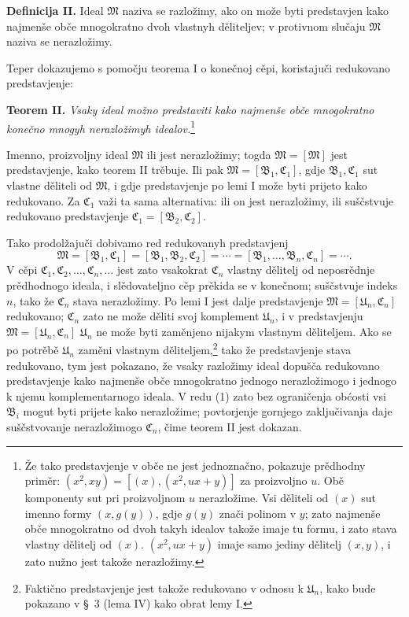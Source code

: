 \documentclass[11pt]{article}
\newcommand{\ideal}[1]{\mathfrak{#1}}
\begin{document}
\textbf{Definicija II.} Ideal \(\ideal M\) naziva se razložimy, ako on može byti predstavjen kako najmenše obče mnogokratno dvoh vlastnyh děliteljev; v protivnom slučaju \(\ideal M\) naziva se nerazložimy.

Teper dokazujemo s pomočju teorema I o konečnoj cěpi, koristajuči redukovano predstavjenje:

\textbf{Teorem II.} \emph{Vsaky ideal možno predstaviti kako najmenše obče mnogokratno konečno mnogyh nerazložimyh idealov.}\footnote{Že tako predstavjenje v obče ne jest jednoznačno, pokazuje prědhodny priměr: \((x^2,xy)=[(x),(x^2,ux+y)]\) za proizvoljno \(u\). Obě komponenty sut pri proizvoljnom \(u\) nerazložime. Vsi děliteli od \((x)\) sut imenno formy \((x,g(y))\), gdje \(g(y)\) znači polinom v \(y\); zato najmenše obče mnogokratno od dvoh takyh idealov takože imaje tu formu, i zato stava vlastny dělitelj od \((x)\). \((x^2,ux+y)\) imaje samo jediny dělitelj \((x,y)\), i zato nužno jest takože nerazložimy.}

Imenno, proizvoljny ideal \(\ideal M\) ili jest nerazložimy; togda \(\ideal M=[\ideal M]\) jest predstavjenje, kako teorem II trěbuje. Ili pak \(\ideal M=[\ideal B_1,\ideal C_1]\), gdje \(\ideal B_1,\ideal C_1\) sut vlastne děliteli od \(\ideal M\), i gdje predstavjenje po lemi I može byti prijeto kako redukovano. Za \(\ideal C_1\) važi ta sama alternativa: ili on jest nerazložimy, ili suščstvuje redukovano predstavjenje \(\ideal C_1=[\ideal B_2,\ideal C_2]\).

Tako prodolžajuči dobivamo red redukovanyh predstavjenj
\begin{equation}
 \ideal M=[\ideal B_1,\ideal C_1]=[\ideal B_1,\ideal B_2,\ideal C_2]=\cdots=[\ideal B_1,\ldots,\ideal B_n,\ideal C_n]=\cdots .
\tag{1}
\end{equation}
V cěpi \(\ideal C_1,\ideal C_2,\ldots,\ideal C_n,\ldots\) jest zato vsakokrat \(\ideal C_n\) vlastny dělitelj od neposrědnje prědhodnogo ideala, i slědovateljno cěp prěkida se v konečnom; suščstvuje indeks \(n\), tako že \(\ideal C_n\) stava nerazložimy. Po lemi I jest dalje predstavjenje \(\ideal M=[\ideal U_n,\ideal C_n]\) redukovano; \(\ideal C_n\) zato ne može děliti svoj komplement \(\ideal U_n\), i v predstavjenju \(\ideal M=[\ideal U_n,\ideal C_n]\) \(\ideal U_n\) ne može byti zaměnjeno nijakym vlastnym děliteljem. Ako se po potrěbě \(\ideal U_n\) zaměni vlastnym děliteljem,\footnote{Faktično predstavjenje jest takože redukovano v odnosu k \(\ideal U_n\), kako bude pokazano v \S~3 (lema IV) kako obrat lemy I.} tako že predstavjenje stava redukovano, tym jest pokazano, že vsaky razložimy ideal dopušča redukovano predstavjenje kako najmenše obče mnogokratno jednogo nerazložimogo i jednogo k njemu komplementarnogo ideala. V redu (1) zato bez ograničenja obćosti vsi \(\ideal B_i\) mogut byti prijete kako nerazložime; povtorjenje gornjego zaključivanja daje suščstvovanje nerazložimogo \(\ideal C_n\), čime teorem II jest dokazan.

\clearpage
\end{document}

